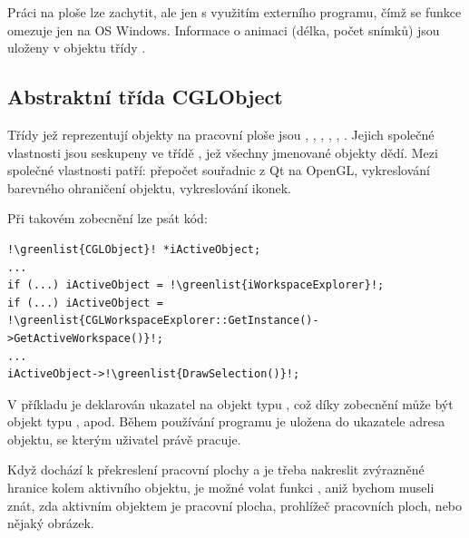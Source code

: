 Práci na ploše lze zachytit, ale jen s využitím externího programu, čímž se funkce omezuje jen na OS Windows. Informace o animaci (délka, počet snímků) jsou uloženy v objektu třídy .


\subsection*{Abstraktní třída CGLObject}
Třídy jež reprezentují objekty na pracovní ploše jsou , , , , , . Jejich společné vlastnosti jsou seskupeny ve třídě , jež všechny jmenované objekty dědí. Mezi společné vlastnosti patří: přepočet souřadnic z Qt na OpenGL, vykreslování barevného ohraničení objektu, vykreslování ikonek.

Při takovém zobecnění lze psát kód:

\begin{lstlisting}[caption={Zobecnění pomocí abstraktní funkce \clist{CGLObject}.}]
!\greenlist{CGLObject}! *iActiveObject;
...
if (...) iActiveObject = !\greenlist{iWorkspaceExplorer}!;
if (...) iActiveObject = !\greenlist{CGLWorkspaceExplorer::GetInstance()->GetActiveWorkspace()}!;
...
iActiveObject->!\greenlist{DrawSelection()}!;
\end{lstlisting}

V příkladu je deklarován ukazatel na objekt typu , což díky zobecnění může být objekt typu ,  apod. Během používání programu je uložena do ukazatele adresa objektu, se kterým uživatel právě pracuje.

Když dochází k překreslení pracovní plochy a je třeba nakreslit zvýrazněné hranice kolem aktivního objektu, je možné volat funkci , aniž bychom museli znát, zda aktivním objektem je pracovní plocha, prohlížeč pracovních ploch, nebo nějaký obrázek.



